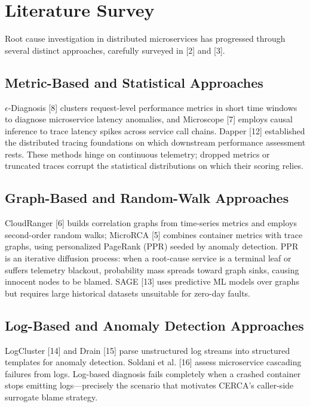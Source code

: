 \documentclass[conference]{IEEEtran}
\begin{document}
\section{Literature Survey}

Root cause investigation in distributed microservices has progressed through several distinct approaches, carefully surveyed in [2] and [3].

\subsection{Metric-Based and Statistical Approaches}
$\epsilon$-Diagnosis [8] clusters request-level performance metrics in short time windows to diagnose microservice latency anomalies, and Microscope [7] employs causal inference to trace latency spikes across service call chains. Dapper [12] established the distributed tracing foundations on which downstream performance assessment rests. These methods hinge on continuous telemetry; dropped metrics or truncated traces corrupt the statistical distributions on which their scoring relies.

\subsection{Graph-Based and Random-Walk Approaches}
CloudRanger [6] builds correlation graphs from time-series metrics and employs second-order random walks; MicroRCA [5] combines container metrics with trace graphs, using personalized PageRank (PPR) seeded by anomaly detection. PPR is an iterative diffusion process: when a root-cause service is a terminal leaf or suffers telemetry blackout, probability mass spreads toward graph sinks, causing innocent nodes to be blamed. SAGE [13] uses predictive ML models over graphs but requires large historical datasets unsuitable for zero-day faults.

\subsection{Log-Based and Anomaly Detection Approaches}
LogCluster [14] and Drain [15] parse unstructured log streams into structured templates for anomaly detection. Soldani et al. [16] assess microservice cascading failures from logs. Log-based diagnosis fails completely when a crashed container stops emitting logs---precisely the scenario that motivates CERCA's caller-side surrogate blame strategy.
\end{document}
